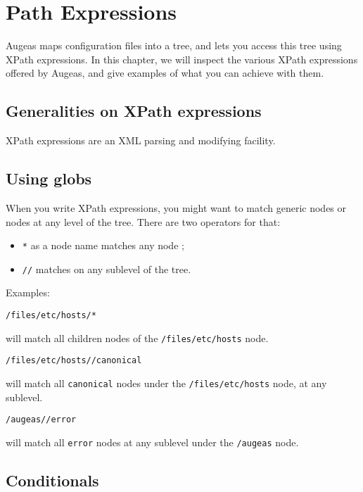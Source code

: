 \chapter{Path Expressions}

 

Augeas maps configuration files into a tree, and lets you access this tree using XPath expressions. In this chapter, we will inspect the various XPath expressions offered by Augeas, and give examples of what you can achieve with them.

\section{Generalities on XPath expressions}

XPath expressions are an XML parsing and modifying facility.

\section{Using globs}

When you write XPath expressions, you might want to match generic nodes or nodes at any level of the tree. There are two operators for that:

\begin{itemize}
\item
  \verb!*! as a node name matches any node ;
\item
  \verb!//! matches on any sublevel of the tree.
\end{itemize}
Examples:

\begin{verbatim}
/files/etc/hosts/*
\end{verbatim}
will match all children nodes of the \verb!/files/etc/hosts! node.

\begin{verbatim}
/files/etc/hosts//canonical
\end{verbatim}
will match all \verb!canonical! nodes under the \verb!/files/etc/hosts! node, at any sublevel.


\begin{verbatim}
/augeas//error
\end{verbatim}
will match all \verb!error! nodes at any sublevel under the \verb!/augeas! node.

\section{Conditionals}

